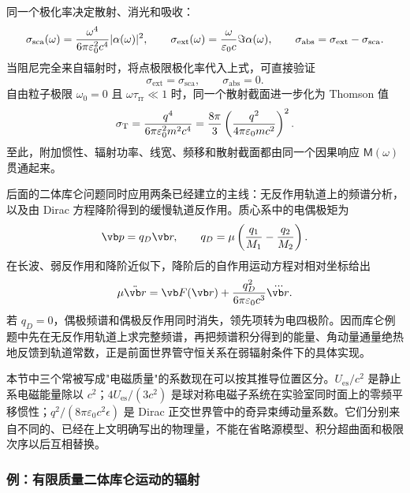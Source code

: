 同一个极化率决定散射、消光和吸收：
\begin{equation*}
	\sigma_{\mathrm{sca}}(\omega)
	={\omega^4\over6\pi\varepsilon_0^2c^4}|\alpha(\omega)|^2,
	\qquad
	\sigma_{\mathrm{ext}}(\omega)
	={\omega\over\varepsilon_0c}\Im\alpha(\omega),
	\qquad
	\sigma_{\mathrm{abs}}=\sigma_{\mathrm{ext}}-\sigma_{\mathrm{sca}}.
\end{equation*}
当阻尼完全来自辐射时，将点极限极化率代入上式，可直接验证
\begin{equation*}
	\sigma_{\mathrm{ext}}=\sigma_{\mathrm{sca}},
	\qquad
	\sigma_{\mathrm{abs}}=0.
\end{equation*}
自由粒子极限 $\omega_0=0$ 且 $\omega\tau_{\mathrm{rr}}\ll1$ 时，同一个散射截面进一步化为 Thomson 值
\begin{equation*}
	\sigma_{\mathrm T}
	={q^4\over6\pi\varepsilon_0^2m^2c^4}
	={8\pi\over3}
	\left({q^2\over4\pi\varepsilon_0mc^2}\right)^2.
\end{equation*}
至此，附加惯性、辐射功率、线宽、频移和散射截面都由同一个因果响应 $\mathsf M(\omega)$ 贯通起来。

后面的二体库仑问题同时应用两条已经建立的主线：无反作用轨道上的频谱分析，以及由 Dirac 方程降阶得到的缓慢轨道反作用。质心系中的电偶极矩为
\begin{equation*}
	\vb p=q_D\vb r,
	\qquad
	q_D=\mu\left({q_1\over M_1}-{q_2\over M_2}\right).
\end{equation*}
在长波、弱反作用和降阶近似下，降阶后的自作用运动方程对相对坐标给出
\begin{equation*}
	\mu\ddot{\vb r}
	=\vb F(\vb r)
	+{q_D^2\over6\pi\varepsilon_0c^3}\dddot{\vb r}.
\end{equation*}
若 $q_D=0$，偶极频谱和偶极反作用同时消失，领先项转为电四极阶。因而库仑例题中先在无反作用轨道上求完整频谱，再把频谱积分得到的能量、角动量通量绝热地反馈到轨道常数，正是前面世界管守恒关系在弱辐射条件下的具体实现。

本节中三个常被写成"电磁质量"的系数现在可以按其推导位置区分。$U_{\mathrm{es}}/c^2$ 是静止系电磁能量除以 $c^2$；$4U_{\mathrm{es}}/(3c^2)$ 是球对称电磁子系统在实验室同时面上的零频平移惯性；$q^2/(8\pi\varepsilon_0c^2\epsilon)$ 是 Dirac 正交世界管中的奇异束缚动量系数。它们分别来自不同的、已经在上文明确写出的物理量，不能在省略源模型、积分超曲面和极限次序以后互相替换。

\subsubsection{例：有限质量二体库仑运动的辐射}

